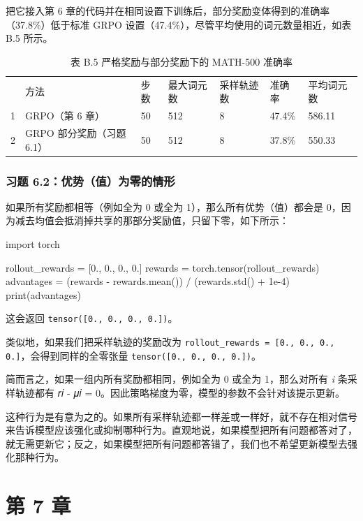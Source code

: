 把它接入第 6 章的代码并在相同设置下训练后，部分奖励变体得到的准确率（37.8\%）低于标准 GRPO 设置（47.4\%），尽管平均使用的词元数量相近，如表 B.5 所示。

\begin{table}[htbp]
\centering\small
\centering
\caption{表 B.5 严格奖励与部分奖励下的 MATH-500 准确率}
\begin{tabularx}{\linewidth}{@{}c@{}XXXXXX}
\toprule
 & 方法 & 步数 & 最大词元数 & 采样轨迹数 & 准确率 & 平均词元数 \\
1 & GRPO（第 6 章） & 50 & 512 & 8 & 47.4\% & 586.11 \\
2 & GRPO 部分奖励（习题 6.1） & 50 & 512 & 8 & 37.8\% & 550.33 \\ \bottomrule
\end{tabularx}
\end{table}

\subsubsection*{习题 6.2：优势（值）为零的情形}

如果所有奖励都相等（例如全为 0 或全为 1），那么所有优势（值）都会是 0，因为减去均值会抵消掉共享的那部分奖励值，只留下零，如下所示：

\begin{codebox}
import torch

rollout_rewards = [0., 0., 0., 0.]
rewards = torch.tensor(rollout_rewards)
advantages = (rewards - rewards.mean()) / (rewards.std() + 1e-4)
print(advantages)
\end{codebox}

这会返回 \texttt{tensor([0., 0., 0., 0.])}。

类似地，如果我们把采样轨迹的奖励改为 \texttt{rollout\_rewards = [0., 0., 0., 0.]}，会得到同样的全零张量 \texttt{tensor([0., 0., 0., 0.])}。

简而言之，如果一组内所有奖励都相同，例如全为 0 或全为 1，那么对所有 \emph{i} 条采样轨迹都有 𝑟𝑖 - 𝜇𝑖 = 0。因此策略梯度为零，模型的参数不会针对该提示更新。

这种行为是有意为之的。如果所有采样轨迹都一样差或一样好，就不存在相对信号来告诉模型应该强化或抑制哪种行为。直观地说，如果模型把所有问题都答对了，就无需更新它；反之，如果模型把所有问题都答错了，我们也不希望更新模型去强化那种行为。

\section{第 7 章}

